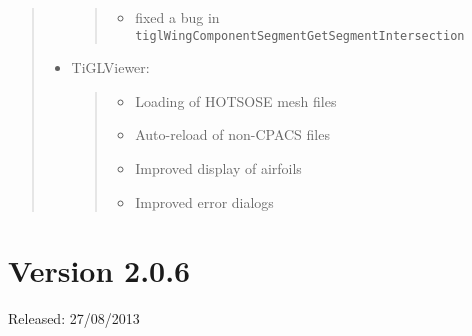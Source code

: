 \documentclass[]{scrartcl}
\begin{document}
\begin{quote}
\begin{itemize}
  \begin{quote}
  \begin{itemize}
  \itemsep1pt\parskip0pt
  \item
    fixed a bug in
    \texttt{tiglWingComponentSegmentGetSegmentIntersection}
  \end{itemize}
  \end{quote}
\item
  TiGLViewer:

  \begin{quote}
  \begin{itemize}
  \itemsep1pt\parskip0pt
  \item
    Loading of HOTSOSE mesh files
  \item
    Auto-reload of non-CPACS files
  \item
    Improved display of airfoils
  \item
    Improved error dialogs
  \end{itemize}
  \end{quote}
\end{itemize}
\end{quote}

\section{Version 2.0.6}

Released: 27/08/2013
\end{document}

